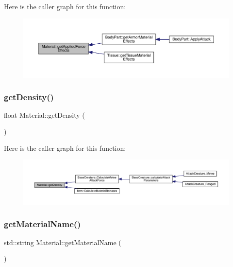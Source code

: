 Here is the caller graph for this function\+:
\nopagebreak
\begin{figure}[H]
\begin{center}
\leavevmode
\includegraphics[width=350pt]{class_material_ad443d451fe4f333fa2bd56f11937ebb0_icgraph}
\end{center}
\end{figure}
\mbox{\label{class_material_a40740dabb21cc8ba24b168935e10b06f}} 
\subsubsection{\texorpdfstring{get\+Density()}{getDensity()}}
{\footnotesize\ttfamily float Material\+::get\+Density (\begin{DoxyParamCaption}{ }\end{DoxyParamCaption})}

Here is the caller graph for this function\+:
\nopagebreak
\begin{figure}[H]
\begin{center}
\leavevmode
\includegraphics[width=350pt]{class_material_a40740dabb21cc8ba24b168935e10b06f_icgraph}
\end{center}
\end{figure}
\mbox{\label{class_material_a6259941981c91ac2f0c0baa0dd53c160}} 
\subsubsection{\texorpdfstring{get\+Material\+Name()}{getMaterialName()}}
{\footnotesize\ttfamily std\+::string Material\+::get\+Material\+Name (\begin{DoxyParamCaption}{ }\end{DoxyParamCaption})}

